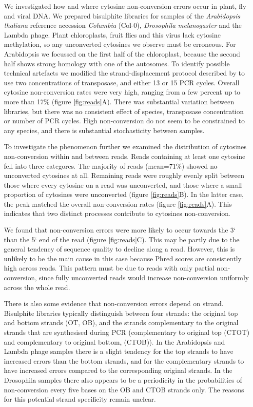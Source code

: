 \documentclass[12pt,longbibliography]{article}
\begin{document}
We investigated how and where cytosine non-conversion errors occur in plant, fly and viral DNA.
We prepared bisulphite libraries for samples of the \textit{Arabidopsis thaliana} reference accession \textit{Columbia} (Col-0), \textit{Drosophila melanogaster} and the Lambda phage.
Plant chloroplasts, fruit flies and this virus lack cytosine methylation, so any unconverted cytosines we observe must be erroneous.
For Arabidopsis we focussed on the first half of the chloroplast, because the second half shows strong homology with one of the autosomes.
To identify possible technical artefacts we modified the strand-displacement protocol described by \textcite{weichenhan2018tagmentation} to use two concentrations of transposase, and either 13 or 15 PCR cycles.
Overall cytosine non-conversion rates were very high, ranging from a few percent up to more than 17\% (figure \ref{fig:reads}A).
There was substantial variation between libraries, but there was no consistent effect of species, transposase concentration or number of PCR cycles.
High non-conversion do not seem to be constrained to any species, and there is substantial stochasticity between samples.

To investigate the phenomenon further we examined the distribution of cytosines non-conversion within and between reads.
Reads containing at least one cytosine fell into three categores.
The majority of reads (mean=71\%) showed no unconverted cytosines at all.
Remaining reads were roughly evenly split between those where every cytosine on a read was unconverted, and those where a small proportion of cytosines were unconverted (figure \ref{fig:reads}B).
In the latter case, the peak matched the overall non-conversion rates (figure \ref{fig:reads}A).
This indicates that two distinct processes contribute to cytosines non-conversion.

We found that non-conversion errors were more likely to occur towards the 3` than the 5` end of the read (figure \ref{fig:reads}C).
This may be partly due to the general tendency of sequence quality to decline along a read.
However, this is unlikely to be the main cause in this case because Phred scores are consistently high across reads.
This pattern must be due to reads with only partial non-conversion, since fully unconverted reads would increase non-conversion uniformly across the whole read.

There is also some evidence that non-conversion errors depend on strand.
Bisulphite libraries typically distinguish between four strands: the original top and bottom strands (OT, OB), and the strands complementary to the original strands that are synthesised during PCR (complementary to original top (CTOT) and complementary to original bottom, (CTOB)).
In the Arabidopsis and Lambda phage samples there is a slight tendency for the top strands to have increased errors than the bottom strands, and for the complementary strands to have increased errors compared to the corresponding original strands.
In the Drosophila samples there also appears to be a periodicity in the probabilities of non-conversion every five bases on the OB and CTOB strands only.
The reasons for this potential strand specificity remain unclear.
\end{document}
